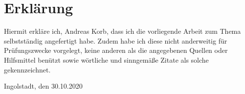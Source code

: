 \section*{Erklärung}
\thispagestyle{empty}
\makeatletter
Hiermit erkläre ich, Andreas Korb, dass ich die vorliegende Arbeit zum Thema
\textit{\@title} selbstständig angefertigt habe. Zudem habe ich diese nicht anderweitig für Prüfungszwecke vorgelegt, keine anderen als die angegebenen Quellen oder Hilfsmittel benützt sowie wörtliche und sinngemäße Zitate als solche gekennzeichnet.
\vspace{3cm}

Ingolstadt, den 30.10.2020
\makeatother